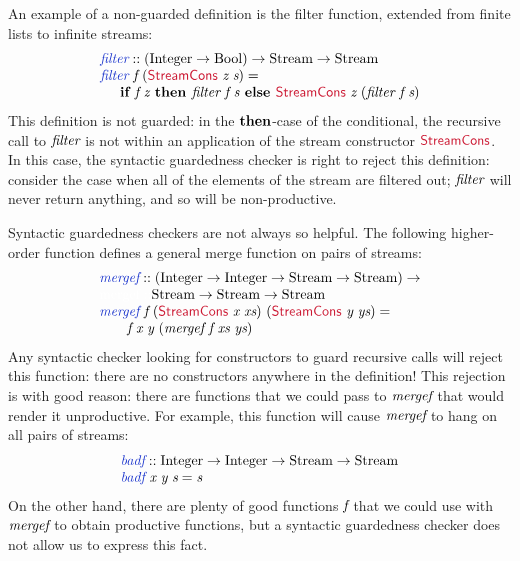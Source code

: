 An example of a non-guarded definition is the filter function,
extended from finite lists to infinite streams:
\begin{displaymath}
  \begin{array}{l}
    \defn{filter} :: (\tyname{Integer} \to \tyname{Bool}) \to \tyname{Stream} \to \tyname{Stream} \\
    \defn{filter}\ \ident{f}\ (\cons{StreamCons}\ \ident{z}\ \ident{s}) = \\
    \hspace{0.5cm}\kw{if }\ident{f}\ \ident{z}\kw{ then }\ident{filter}\ \ident{f}\ \ident{s}\kw{ else }\cons{StreamCons}\ \ident{z}\ (\ident{filter}\ \ident{f}\ \ident{s})
  \end{array}
\end{displaymath}
This definition is not guarded: in the $\textbf{then}$-case of the
conditional, the recursive call to $\textit{filter}$ is not within an
application of the stream constructor $\cons{StreamCons}$. In this
case, the syntactic guardedness checker is right to reject this
definition: consider the case when all of the elements of the stream
are filtered out; $\textit{filter}$ will never return anything, and so
will be non-productive.

Syntactic guardedness checkers are not always so helpful. The
following higher-order function defines a general merge function on
pairs of streams:
\begin{displaymath}
  \begin{array}{l}
    \defn{mergef} :: (\tyname{Integer} \to \tyname{Integer} \to \tyname{Stream} \to \tyname{Stream}) \to \\
    \textcolor{white}{\textrm{mergef} :: }\tyname{Stream} \to \tyname{Stream} \to \tyname{Stream} \\
    \defn{mergef}\ \ident{f}\ (\cons{StreamCons}\ \ident{x}\ \ident{xs})\ (\cons{StreamCons}\ \ident{y}\ \ident{ys}) = \\
    \quad\quad \ident{f}\ \ident{x}\ \ident{y}\ (\ident{mergef}\ \ident{f}\ \ident{xs}\ \ident{ys})
  \end{array}
\end{displaymath}
Any syntactic checker looking for constructors to guard recursive
calls will reject this function: there are no constructors anywhere in
the definition! This rejection is with good reason: there are
functions that we could pass to $\textit{mergef}$ that would render it
unproductive. For example, this function will cause $\textit{mergef}$
to hang on all pairs of streams:
\begin{displaymath}
  \begin{array}{l}
    \defn{badf} :: \tyname{Integer} \to \tyname{Integer} \to \tyname{Stream} \to \tyname{Stream} \\
    \defn{badf}\ \ident{x}\ \ident{y}\ \ident{s} = \ident{s}
  \end{array}
\end{displaymath}
On the other hand, there are plenty of good functions $\textit{f}$ that
we could use with $\textit{mergef}$ to obtain productive functions, but
a syntactic guardedness checker does not allow us to express this
fact.

